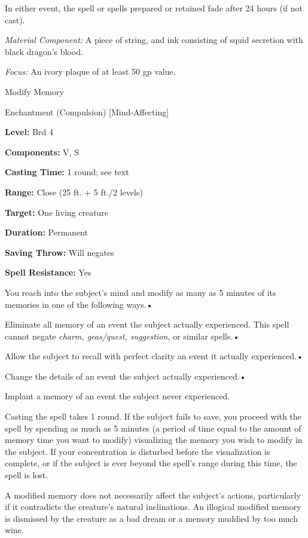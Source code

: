 \documentclass{article}
\begin{document}
In either event, the spell or spells prepared or retained fade after 24 hours (if 
not cast).

\textit{Material Component: }A piece of string, and ink consisting of squid secretion 
with black dragon's blood.

\textit{Focus: }An ivory plaque of at least 50 gp value.

\vspace{12pt}
Modify Memory

Enchantment (Compulsion) [Mind-Affecting]

\textbf{Level:} Brd 4

\textbf{Components:} V, S

\textbf{Casting Time:} 1 round; see text

\textbf{Range:} Close (25 ft. + 5 ft./2 levels)

\textbf{Target:} One living creature

\textbf{Duration:} Permanent

\textbf{Saving Throw: }Will negates

\textbf{Spell Resistance:} Yes

You reach into the subject's mind and modify as many as 5 minutes of its memories 
in one of the following ways.• 

Eliminate all memory of an event the subject actually experienced. This spell cannot 
negate \textit{charm, geas/quest, suggestion, }or similar spells.• 

Allow the subject to recall with perfect clarity an event it actually experienced.• 

Change the details of an event the subject actually experienced.• 

Implant a memory of an event the subject never experienced.

Casting the spell takes 1 round. If the subject fails to save, you proceed with 
the spell by spending as much as 5 minutes (a period of time equal to the amount 
of memory time you want to modify) visualizing the memory you wish to modify in 
the subject. If your concentration is disturbed before the visualization is complete, 
or if the subject is ever beyond the spell's range during this time, the spell 
is lost.

A modified memory does not necessarily affect the subject's actions, particularly 
if it contradicts the creature's natural inclinations. An illogical modified memory 
is dismissed by the creature as a bad dream or a memory muddied by too much wine. 
\end{document}
